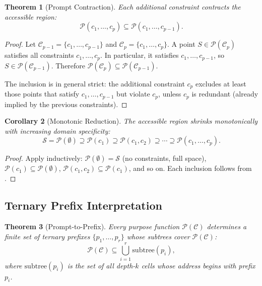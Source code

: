 \documentclass[11pt,twocolumn,a4paper]{article}
\newtheorem{theorem}{Theorem}[section]
\newtheorem{corollary}[theorem]{Corollary}
\theoremstyle{definition}
\theoremstyle{remark}
\newcommand{\Sspace}{\mathcal{S}}
\newcommand{\Purpose}{\mathcal{P}}
\newcommand{\Context}{\mathcal{C}}
\begin{document}
\begin{theorem}[Prompt Contraction]\label{thm:contraction}
Each additional constraint contracts the accessible region:
\begin{equation}\label{eq:contraction}
  \Purpose(c_1, \ldots, c_p) \subseteq \Purpose(c_1, \ldots, c_{p-1}).
\end{equation}
\end{theorem}

\begin{proof}
Let $\Context_{p-1} = \{c_1, \ldots, c_{p-1}\}$ and $\Context_p = \{c_1, \ldots, c_p\}$. A point $S \in \Purpose(\Context_p)$ satisfies all constraints $c_1, \ldots, c_p$. In particular, it satisfies $c_1, \ldots, c_{p-1}$, so $S \in \Purpose(\Context_{p-1})$. Therefore $\Purpose(\Context_p) \subseteq \Purpose(\Context_{p-1})$.

The inclusion is in general strict: the additional constraint $c_p$ excludes at least those points that satisfy $c_1, \ldots, c_{p-1}$ but violate $c_p$, unless $c_p$ is redundant (already implied by the previous constraints).
\end{proof}

\begin{corollary}[Monotonic Reduction]\label{cor:monotonic}
The accessible region shrinks monotonically with increasing domain specificity:
\begin{equation}\label{eq:monotonic}
  \Sspace = \Purpose(\emptyset) \supseteq \Purpose(c_1) \supseteq \Purpose(c_1, c_2) \supseteq \cdots \supseteq \Purpose(c_1, \ldots, c_p).
\end{equation}
\end{corollary}

\begin{proof}
Apply  inductively: $\Purpose(\emptyset) = \Sspace$ (no constraints, full space), $\Purpose(c_1) \subseteq \Purpose(\emptyset)$, $\Purpose(c_1, c_2) \subseteq \Purpose(c_1)$, and so on. Each inclusion follows from .
\end{proof}

\subsection{Ternary Prefix Interpretation}\label{sec:prefix-interp}

\begin{theorem}[Prompt-to-Prefix]\label{thm:prompt-prefix}
Every purpose function $\Purpose(\Context)$ determines a finite set of ternary prefixes $\{p_1, \ldots, p_r\}$ whose subtrees cover $\Purpose(\Context)$:
\begin{equation}\label{eq:prompt-prefix}
  \Purpose(\Context) \subseteq \bigcup_{i=1}^{r} \mathrm{subtree}(p_i),
\end{equation}
where $\mathrm{subtree}(p_i)$ is the set of all depth-$k$ cells whose address begins with prefix $p_i$.
\end{theorem}
\end{document}
